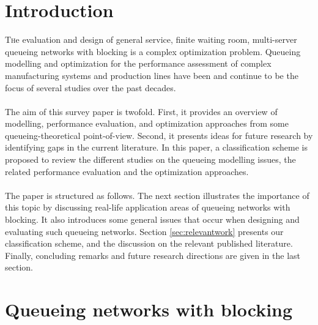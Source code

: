 \documentclass[twoside]{article}
\begin{document}
\begin{multicols}{2} %

\section{\textbf{Introduction}}

\lettrine[nindent=0em,lines=3]{T}he evaluation and design of general service, finite waiting room, multi-server queueing networks with blocking is a complex optimization problem.  Queueing modelling and optimization for the performance assessment of complex manufacturing systems and production lines have been and continue to be the focus of several studies over the past decades.
\\\\
The aim of this survey paper is twofold. First, it provides an overview of modelling, performance evaluation, and optimization approaches from some queueing-theoretical point-of-view. Second, it presents ideas for future research by identifying gaps in the current literature. 
In this paper, a classification scheme is proposed to review the different studies on the queueing modelling issues, the related performance evaluation and the optimization approaches. \\\\
The paper is structured as follows. The next section illustrates the importance of this topic by discussing real-life application areas of queueing networks with blocking. It also introduces some general issues that occur when designing and evaluating such queueing networks. Section \ref{sec:relevantwork} presents our classification scheme,  and  the discussion on the relevant published literature. Finally, concluding remarks and future research directions are given in the last section.


\section{\textbf{Queueing networks with blocking}}


\end{multicols}
\end{document}

